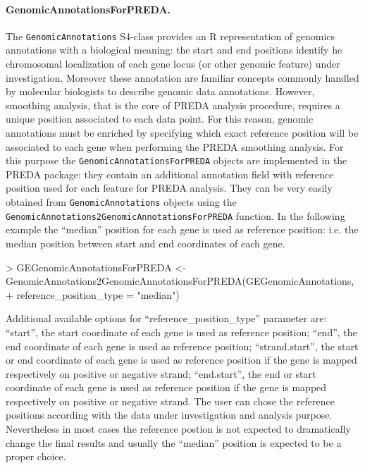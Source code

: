 \documentclass[a4paper,10pt]{article}
\begin{document}
\paragraph{GenomicAnnotationsForPREDA.}
The \texttt{GenomicAnnotations} S4-class provides an R representation of genomics annotations with a biological meaning: the start and end positions identify he chromosomal localization of each gene locus (or other genomic feature) under investigation. Moreover these annotation are familiar concepts commonly handled by molecular biologists to describe genomic data annotations.
However, smoothing analysis, that is the core of PREDA analysis procedure, requires a unique position associated to each data point. For this reason, genomic annotations must be enriched by specifying which exact reference position will be associated to each gene when performing the PREDA smoothing analysis. For this purpose the \texttt{GenomicAnnotationsForPREDA} objects are implemented in the PREDA package: they contain an additional annotation field with reference position used for each feature for PREDA analysis. They can be very easily obtained from \texttt{GenomicAnnotations} objects using the \texttt{GenomicAnnotations2GenomicAnnotationsForPREDA} function. In the following example the ``median'' position for each gene is used as reference position: i.e. the median position between start and end coordinates of each gene.

\begin{Schunk}
\begin{Sinput}
> GEGenomicAnnotationsForPREDA <- GenomicAnnotations2GenomicAnnotationsForPREDA(GEGenomicAnnotations, 
+     reference_position_type = "median")
\end{Sinput}
\end{Schunk}

Additional available options for ``reference\_position\_type'' parameter are: ``start'', the start coordinate of each gene is used as reference position; ``end'', the end coordinate of each gene is used as reference position; ``strand.start'', the start or end coordinate of each gene is used as reference position if the gene is mapped respectively on positive or negative strand; ``end.start'', the end or start coordinate of each gene is used as reference position if the gene is mapped respectively on positive or negative strand. The user can chose the reference positions according with the data under investigation and analysis purpose. Nevertheless in most cases the reference postion is not expected to dramatically change the final results and usually the ``median'' position is expected to be a proper choice.
\end{document}
